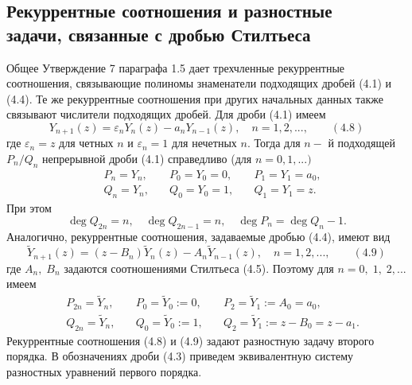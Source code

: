 \documentclass[12pt,a4paper]{article}
\theoremstyle{plain}   \newtheorem{Pro}{Задача}
\begin{document}
\subsection{Рекуррентные соотношения и разностные\\
задачи, связанные с дробью Стилтьеса}
Общее Утверждение 7 параграфа 1.5 дает трехчленные рекуррентные
соотношения, связывающие полиномы знаменатели подходящих
дробей (4.1) и (4.4). Те же рекуррентные соотношения при других
начальных данных также связывают числители подходящих дробей.
Для дроби (4.1) имеем
\begin{equation*}
  Y_{n+1}(z)=\varepsilon _n Y_n (z)-a_n Y_{n-1}(z),
  \quad n=1,2,..., \qquad (4.8)
\end{equation*}
где
$ \varepsilon _n =z $
для четных
$ n $
и
$ \varepsilon _n =1 $
для нечетных
$ n . $
Тогда для
$ n- $
й подходящей
$ P_n /Q_n $
непрерывной дроби (4.1) справедливо (для
$ n=0,1,...) $
\begin{align*}
  \; & P_n =Y_n , \quad & P_0 =Y_0 =0, \quad & P_1 =Y_1 =a_0 , \\
  \; & Q_n =Y_n , \quad & Q_0 =Y_0 =1, \quad & Q_1 =Y_1 =z .
\end{align*}
При этом
\begin{equation*}
  \deg Q_{2n}=n, \quad \deg Q_{2n-1}=n, \quad
  \deg P_n = \deg Q_n -1.
\end{equation*}
Аналогично, рекуррентные соотношения, задаваемые дробью
(4.4), имеют вид
\begin{equation*}
  \tilde Y_{n+1}(z)=(z-B_n )\tilde Y_n (z)-A_n \tilde Y_{n-1}(z),
  \quad n=1,2,..., \qquad (4.9)
\end{equation*}
где
$ A_n , \; B_n $
задаются соотношениями Стилтьеса (4.5).
Поэтому для
$ n=0, \; 1, \; 2,... $
имеем
\begin{align*}
  \; & P_{2n}=\tilde Y_n , \quad & P_0 =\tilde Y_0 :=0,
  \quad &  P_2 =\tilde Y_1 :=A_0 =a_0,\\
  \; & Q_{2n}=\tilde Y_n , \quad & Q_0 =\tilde Y_0 :=1,
  \quad & Q_2 =\tilde Y_1 :=z-B_0 =z-a_1 .
\end{align*}
Рекуррентные соотношения (4.8) и (4.9) задают разностную задачу
второго порядка. В обозначениях дроби (4.3) приведем эквивалентную
систему разностных уравнений первого порядка.
\end{document}
